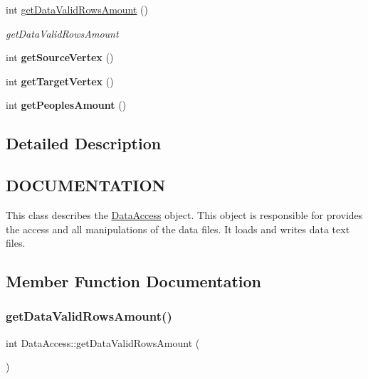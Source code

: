 \begin{DoxyCompactItemize}
$$int \hyperlink{classDataAccess_a8e20b7327717b82f11a03b5e9a6a1778}{get\+Data\+Valid\+Rows\+Amount} ()
\begin{DoxyCompactList}\small\item\em get\+Data\+Valid\+Rows\+Amount \end{DoxyCompactList}\item 
\mbox{\label{classDataAccess_a445219930bcb930366daeaeb0564ad41}} 
int {\bfseries get\+Source\+Vertex} ()
\item 
\mbox{\label{classDataAccess_a008da43174b577017ad2c5a9536875d2}} 
int {\bfseries get\+Target\+Vertex} ()
\item 
\mbox{\label{classDataAccess_a8ade5b903a33d62b99d68defd18e4664}} 
int {\bfseries get\+Peoples\+Amount} ()
\end{DoxyCompactItemize}


\subsection{Detailed Description}
\hypertarget{classScreen_CLASS}{}\subsection{D\+O\+C\+U\+M\+E\+N\+T\+A\+T\+I\+ON}\label{classScreen_CLASS}
This class describes the \hyperlink{classDataAccess}{Data\+Access} object. This object is responsible for provides the access and all manipulations of the data files. It loads and writes data text files. 

\subsection{Member Function Documentation}
\mbox{\label{classDataAccess_a8e20b7327717b82f11a03b5e9a6a1778}} 
\subsubsection{\texorpdfstring{get\+Data\+Valid\+Rows\+Amount()}{getDataValidRowsAmount()}}
{\footnotesize\ttfamily int Data\+Access\+::get\+Data\+Valid\+Rows\+Amount (\begin{DoxyParamCaption}{ }\end{DoxyParamCaption})}



